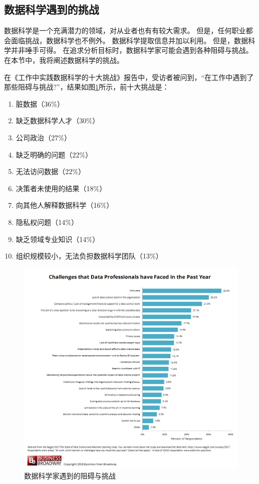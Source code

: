 \documentclass[a4paper, 11pt,twoside=true,UTF8]{scrartcl}
\begin{document}
\subsection{数据科学遇到的挑战}
\qquad 数据科学是一个充满潜力的领域，对从业者也有有较大需求。 但是，任何职业都会面临挑战，数据科学也不例外。 数据科学提取信息并加以利用。 但是，数据科学并非唾手可得。 在追求分析目标时，数据科学家可能会遇到各种阻碍与挑战。 在本节中，我将阐述数据科学的挑战。

在《工作中实践数据科学的十大挑战》报告中，受访者被问到，“在工作中遇到了那些阻碍与挑战?”，结果如图\ref{P1F2}所示，前十大挑战是：

\begin{enumerate}
	\item 脏数据（36\%） \\
	\item 缺乏数据科学人才（30\%） \\
	\item 公司政治（27\%） \\
	\item 缺乏明确的问题（22\%） \\
	\item 无法访问数据（22\%） \\
	\item 决策者未使用的结果（18\%） \\
	\item 向其他人解释数据科学（16\%） \\
	\item 隐私权问题（14\%） \\
	\item 缺乏领域专业知识（14\%） \\
	\item 组织规模较小，无法负担数据科学团队（13\%） \\
\end{enumerate}

\begin{figure}[h]
	\small
	\centering
	\includegraphics[width=13cm]{P1F2}
	\caption{数据科学家遇到的阻碍与挑战} \label{P1F2}
\end{figure}
\end{document}
